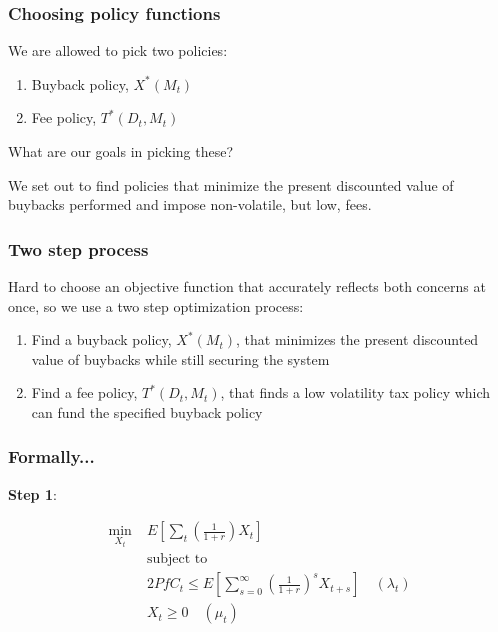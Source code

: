 \documentclass[10pt]{beamer}
\begin{document}
  \begin{frame} \frametitle{Choosing policy functions}

    We are allowed to pick two policies:

    \begin{enumerate}
      \item Buyback policy, $X^*(M_t)$
      \item Fee policy, $T^*(D_t, M_t)$
    \end{enumerate}

    \vspace{0.25cm}

    What are our goals in picking these?

    \vspace{0.25cm}

    We set out to find policies that minimize the present discounted value of buybacks performed and
    impose non-volatile, but low, fees.

  \end{frame}

  \begin{frame} \frametitle{Two step process}

    Hard to choose an objective function that accurately reflects both concerns at once, so we use
    a two step optimization process:

    \begin{enumerate}
      \item Find a buyback policy, $X^*(M_t)$, that minimizes the present discounted value of
            buybacks while still securing the system
      \item Find a fee policy, $T^*(D_t, M_t)$, that finds a low volatility tax policy which can
            fund the specified buyback policy
    \end{enumerate}

  \end{frame}

  \begin{frame} \frametitle{Formally...}

    \textbf{Step 1}:

    \begin{align*}
      \min_{X_t} \; & E \left[ \sum_{t} \left(\frac{1}{1 + r} \right) X_t \right] \\
      &\text{subject to} \\
      \quad & 2 PfC_t \leq E \left[ \sum_{s=0}^{\infty} \left(\frac{1}{1 + r}\right)^s X_{t+s} \right] \quad (\lambda_t) \\
      \quad & X_t \geq 0 \quad (\mu_t)
    \end{align*}

  \end{frame}
\end{document}
